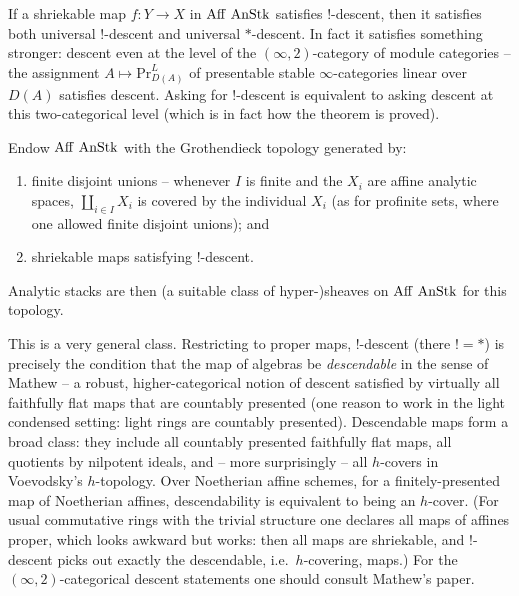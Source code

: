 \begin{theorem}
\label{thm:16:descent}
If a shriekable map $f\colon Y\to X$ in $\operatorname{Aff}\,\operatorname{AnStk}$ satisfies $!$-descent, then it
satisfies both universal $!$-descent and universal $*$-descent. In fact it satisfies
something stronger: descent even at the level of the $(\infty,2)$-category of module
categories -- the assignment $A\mapsto\mathrm{Pr}^L_{D(A)}$ of presentable stable
$\infty$-categories linear over $D(A)$ satisfies descent. Asking for $!$-descent is
equivalent to asking descent at this two-categorical level (which is in fact how the
theorem is proved).
\end{theorem}

\begin{definition}
\label{def:16:topology}
Endow $\operatorname{Aff}\,\operatorname{AnStk}$ with the Grothendieck topology generated by:
\begin{enumerate}
\item finite disjoint unions -- whenever $I$ is finite and the $X_i$ are affine analytic
spaces, $\coprod_{i\in I}X_i$ is covered by the individual $X_i$ (as for profinite sets,
where one allowed finite disjoint unions); and
\item shriekable maps satisfying $!$-descent.
\end{enumerate}
Analytic stacks are then (a suitable class of hyper-)sheaves on $\operatorname{Aff}\,\operatorname{AnStk}$ for this
topology.
\end{definition}

\begin{remark}
\label{rmk:16:descendability}
This is a very general class. Restricting to proper maps, $!$-descent (there $!=*$) is
precisely the condition that the map of algebras be \emph{descendable} in the sense of
Mathew \cite{mathew2016galoisgroupstablehomotopy} -- a robust, higher-categorical notion
of descent satisfied by virtually all faithfully flat maps that are countably presented
(one reason to work in the light condensed setting: light rings are countably
presented). Descendable maps form a broad class: they include all countably presented
faithfully flat maps, all quotients by nilpotent ideals, and -- more surprisingly -- all
$h$-covers in Voevodsky's $h$-topology. Over Noetherian affine schemes, for a
finitely-presented map of Noetherian affines, descendability is equivalent to being an
$h$-cover. (For usual commutative rings with the trivial structure one declares all maps
of affines proper, which looks awkward but works: then all maps are shriekable, and
$!$-descent picks out exactly the descendable, i.e.\ $h$-covering, maps.) For the
$(\infty,2)$-categorical descent statements one should consult Mathew's paper.
\end{remark}

